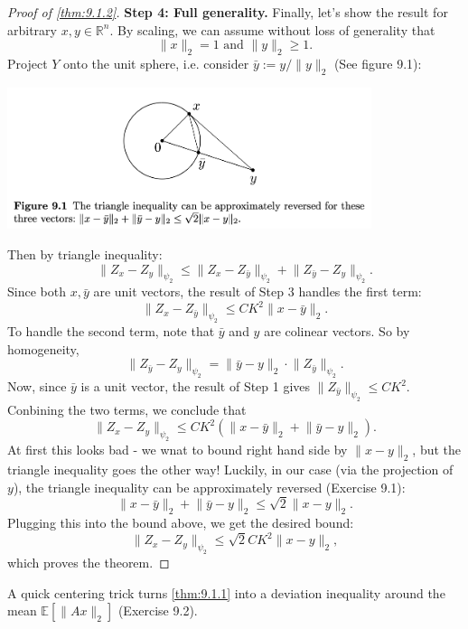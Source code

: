 \begin{proof}[Proof of \cref{thm:9.1.2}]
\textbf{Step 4: Full generality.} Finally, let's show the result for arbitrary $x, y \in \mathbb{R}^n$. By 
scaling, we can assume without loss of generality that 
\[ \lVert x \rVert_{2} = 1 \text{ and } \lVert y \rVert_{2} \geq 1. \]
Project $Y$ onto the unit sphere, i.e. consider $\bar{y} := y / \lVert y \rVert_{2}$ (See figure 9.1):
\begin{center}
	\includegraphics[width=0.8\textwidth]{Chapter 9/fig9-1.png}
\end{center}
Then by triangle inequality:
\[ \lVert Z_x - Z_y \rVert_{\psi_2} \leq \lVert Z_x - Z_{\bar{y}} \rVert_{\psi_2} 
+ \lVert Z_{\bar{y}} - Z_y \rVert_{\psi_2}. \]
Since both $x, \bar{y}$ are unit vectors, the result of Step 3 handles the first term:
\[ \lVert Z_x - Z_{\bar{y}} \rVert_{\psi_2} \leq CK^2 \lVert x - \bar{y} \rVert_{2}. \]
To handle the second term, note that $\bar{y}$ and $y$ are colinear vectors. So by homogeneity, 
\[ \lVert Z_{\bar{y}} - Z_y \rVert_{\psi_2} = \lVert \bar{y} - y \rVert_{2} \cdot \lVert Z_{\bar{y}} 
\rVert_{\psi_2}. \]
Now, since $\bar{y}$ is a unit vector, the result of Step 1 gives $\lVert Z_{\bar{y}} \rVert_{\psi_2} 
\leq CK^2$. Conbining the two terms, we conclude that 
\[ \lVert Z_x - Z_y \rVert_{\psi_2} \leq CK^2 (\lVert x - \bar{y} \rVert_{2} + \lVert \bar{y} - y \rVert_{2}). \]
At first this looks bad - we wnat to bound right hand side by $\lVert x - y \rVert_{2}$, but the triangle 
inequality goes the other way! Luckily, in our case (via the projection of $y$), the triangle inequality can be 
approximately reversed (Exercise 9.1):
\[ \lVert x - \bar{y} \rVert_{2} + \lVert \bar{y} - y \rVert_{2} \leq \sqrt{2}\lVert x - y \rVert_{2}. \]
Plugging this into the bound above, we get the desired bound:
\[ \lVert Z_x - Z_y \rVert_{\psi_2} \leq \sqrt{2}CK^2 \lVert x - y \rVert_{2}, \]
which proves the theorem.
\end{proof}

\begin{remark}
\label{rmk:9.1.3}
A quick centering trick turns \cref{thm:9.1.1} into a deviation inequality around the mean 
$\mathbb{E}\left[ \lVert Ax \rVert_{2} \right]$ (Exercise 9.2).
\end{remark}

